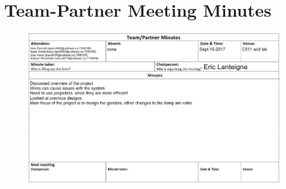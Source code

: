 \documentclass[../main.tex]{subfiles}
\begin{document}
	\section{Team-Partner Meeting Minutes}
		\begin{figure}[H]
			\centering
			\includegraphics[height=0.75\textwidth]{img/minutes/2017-09-15.PNG}
		\end{figure}
\end{document}
